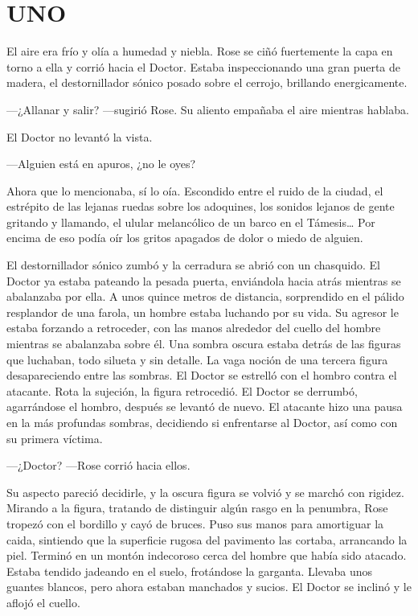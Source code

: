 \chapter*{UNO}

{El aire era frío y olía a humedad y niebla. Rose se ciñó fuertemente la
capa en torno a ella y corrió hacia el Doctor. Estaba inspeccionando una
gran puerta de madera, el destornillador sónico posado sobre el cerrojo,
brillando energicamente.}

{---¿Allanar y salir? ---sugirió Rose. Su aliento empañaba el aire
mientras hablaba.}

{El Doctor no levantó la vista.}

{---Alguien está en apuros, ¿no le oyes?}

{Ahora que lo mencionaba, sí lo oía. Escondido entre el ruido de la
ciudad, el estrépito de las lejanas ruedas sobre los adoquines, los
sonidos lejanos de gente gritando y llamando, el ulular melancólico de
un barco en el Támesis\ldots{} Por encima de eso podía oír los gritos
apagados de dolor o miedo de alguien.}

{El destornillador sónico zumbó y la cerradura se abrió con un
chasquido. El Doctor ya estaba pateando la pesada puerta, enviándola
hacia atrás mientras se abalanzaba por ella. A unos quince metros de
distancia, sorprendido en el pálido resplandor de una farola, un hombre
estaba luchando por su vida. Su agresor le estaba forzando a retroceder,
con las manos alrededor del cuello del hombre mientras se abalanzaba
sobre él. Una sombra oscura estaba detrás de las figuras que luchaban,
todo silueta y sin detalle. La vaga noción de una tercera figura
desapareciendo entre las sombras. El Doctor se estrelló con el hombro
contra el atacante. Rota la sujeción, la figura retrocedió. El Doctor se
derrumbó, agarrándose el hombro, después se levantó de nuevo. El
atacante hizo una pausa en la más profundas sombras, decidiendo si
enfrentarse al Doctor, así como con su primera víctima.}

{---¿Doctor? ---Rose corrió hacia ellos.}

{Su aspecto pareció decidirle, y la oscura figura se volvió y se marchó
con rigidez. Mirando a la figura, tratando de distinguir algún rasgo en
la penumbra, Rose tropezó con el bordillo y cayó de bruces. Puso sus
manos para amortiguar la caida, sintiendo que la superficie rugosa del
pavimento las cortaba, arrancando la piel. Terminó en un montón
indecoroso cerca del hombre que había sido atacado. Estaba tendido
jadeando en el suelo, frotándose la garganta. Llevaba unos guantes
blancos, pero ahora estaban manchados y sucios. El Doctor se inclinó y
le aflojó el cuello.}

